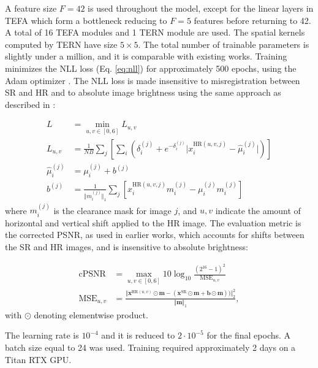 \documentclass[journal]{IEEEtran}
\begin{document}
A feature size $F=42$ is used throughout the model, except for the linear layers in TEFA which form a bottleneck reducing to $F=5$ features before returning to 42. A total of 16 TEFA modules and 1 TERN module are used. The spatial kernels computed by TERN have size $5 \times 5$. The total number of trainable parameters is slightly under a million, and it is comparable with existing works. Training minimizes the NLL loss (Eq. \eqref{eq:nll}) for approximately 500 epochs, using the Adam optimizer \cite{kingma2014adam}. The NLL loss is made insensitive to misregistration between SR and HR and to absolute image brightness using the same approach as described in \cite{molini2019deepsum}:

\begin{align*}
    L &= \min_{u,v\in[0,6]} L_{u,v} \\
    L_{u,v} &= \frac{1}{NB} \sum_j \left[ \sum_i \left( \delta_i^{(j)} + e^{-\delta_i^{(j)}}\vert x_i^{\text{HR}(u,v,j)} - \hat{\mu}_i^{(j)}  \vert \right) \right] \\
    \hat{\mu}_i^{(j)} &= \mu_i^{(j)} + b^{(j)} \\
    b^{(j)} &= \frac{1}{\Vert m_i^{(j)} \Vert_1} \sum_j \left[ x_i^{\text{HR}(u,v,j)}m_i^{(j)} - \mu_i^{(j)}m_i^{(j)} \right]
\end{align*}
where $m_i^{(j)}$ is the clearance mask for image $j$, and $u,v$ indicate the amount of horizontal and vertical shift applied to the HR image.
The evaluation metric is the corrected PSNR, as used in earlier works, which accounts for shifts between the SR and HR images, and is insensitive to absolute brightness:

\begin{align*}
    \mathrm{cPSNR} &= \max_{u,v\in[0,6]} 10\log_{10} \frac{(2^{16}-1)^2}{\mathrm{MSE}_{u,v}}\\
    \mathrm{MSE}_{u,v} &= \frac{\Vert \mathbf{x}^{\text{HR}(u,v)}\odot \mathbf{m} - (\mathbf{x}^\text{SR}\odot\mathbf{m}+\mathbf{b}\odot\mathbf{m})) \Vert_2^2}{\Vert \mathbf{m} \Vert_1},
\end{align*}
with $\odot$ denoting elementwise product.

The learning rate is $10^{-4}$ and it is reduced to $2\cdot10^{-5}$ for the final epochs. A batch size equal to 24 was used. Training required approximately 2 days on a Titan RTX GPU.
\end{document}
